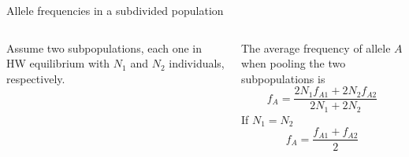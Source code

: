 \begin{frame}{Allele frequencies in a subdivided population}
\begin{columns}
		Assume two subpopulations, each one in HW equilibrium with $N_1$ and $N_2$ individuals, respectively.

		\vskip 0.5cm

		The average frequency of allele $A$ when pooling the two subpopulations is
		\begin{equation}
			f_A = \frac{2 N_1 f_{A1} + 2 N_2 f_{A2}}{2N_1 + 2N_2}
		\end{equation}
		If $N_1=N_2$
		\begin{equation}
                        f_A = \frac{f_{A1} + f_{A2}}{2}
                \end{equation}

        \end{columns}

\end{frame}


